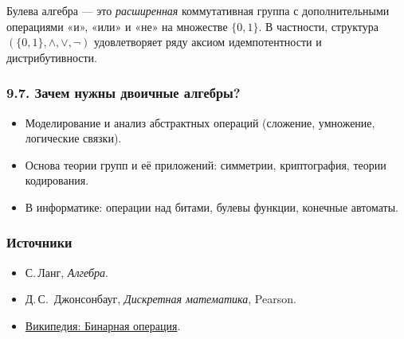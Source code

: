 Булева алгебра — это \emph{расширенная} коммутативная группа с дополнительными операциями «и», «или» и «не» на множестве $\{0,1\}$.  
В частности, структура $(\{0,1\},\wedge,\vee,\neg)$ удовлетворяет ряду аксиом идемпотентности и дистрибутивности.

\subsubsection{9.7. Зачем нужны двоичные алгебры?}

\begin{itemize}[leftmargin=*]
  \item Моделирование и анализ абстрактных операций (сложение, умножение, логические связки).
  \item Основа теории групп и её приложений: симметрии, криптография, теории кодирования.
  \item В информатике: операции над битами, булевы функции, конечные автоматы.
\end{itemize}

\subsubsection{Источники}

\begin{itemize}
  \item С.\,Ланг, \emph{Алгебра}.
  \item Д.\,С. Джонсонбауг, \emph{Дискретная математика}, Pearson.
  \item \href{https://ru.wikipedia.org/wiki/Бинарная_операция}{Википедия: Бинарная операция}.
\end{itemize}